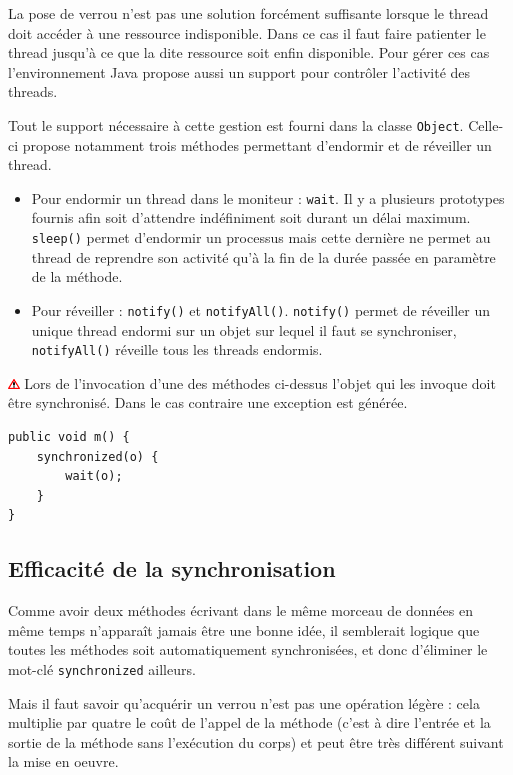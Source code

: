 \documentclass[a4paper,11pt]{report}
\newcommand{\attention}[1]{
	\begin{center}
	\medskip
	\colorbox{attention}{
		\begin{minipage}{0.8\textwidth}\medskip\includegraphics[height=10px]{images/attention.png} #1 \medskip\end{minipage}
	}
	\medskip
	\end{center}
}
\begin{document}
La pose de verrou n\rq{}est pas une solution forcément suffisante lorsque le thread doit accéder à une ressource indisponible. Dans ce cas il faut faire patienter le thread jusqu\rq{}à ce que la dite ressource soit enfin disponible. Pour gérer ces cas l\rq{}environnement Java propose aussi un support pour contrôler l\rq{}activité des threads.

Tout le support nécessaire à cette gestion est fourni dans la classe \texttt{Object}. Celle-ci propose notamment trois méthodes permettant d\rq{}endormir et de réveiller un thread.
\begin{itemize}
\item Pour endormir un thread dans le moniteur : \texttt{wait{}}. Il y a plusieurs prototypes fournis afin soit d\rq{}attendre indéfiniment soit durant un délai maximum.\\
\texttt{sleep()} permet d\rq{}endormir un processus mais cette dernière ne permet au thread de reprendre son activité qu\rq{}à la fin de la durée passée en paramètre de la méthode.
\item Pour réveiller : \texttt{notify()} et \texttt{notifyAll()}. \texttt{notify()} permet de réveiller un unique thread endormi sur un objet sur lequel il faut se synchroniser, \texttt{notifyAll()} réveille tous les threads endormis.
\end{itemize}

\attention{Lors de l\rq{}invocation d\rq{}une des méthodes ci-dessus l\rq{}objet qui les invoque doit être synchronisé. Dans le cas contraire une exception est générée.}

\begin{lstlisting}
public void m() {
	synchronized(o) {
		wait(o);
	}
}
\end{lstlisting}


\subsection{Efficacité de la synchronisation}

Comme avoir deux méthodes écrivant dans le même morceau de données en même temps n\rq{}apparaît jamais être une bonne idée, il semblerait logique que toutes les méthodes soit automatiquement synchronisées, et donc d\rq{}éliminer le mot-clé \texttt{synchronized} ailleurs.

Mais il faut savoir qu\rq{}acquérir un verrou n\rq{}est pas une opération légère : cela multiplie par quatre le coût de l\rq{}appel de la méthode (c\rq{}est à dire l\rq{}entrée et la sortie de la méthode sans l\rq{}exécution du corps) et peut être très différent suivant la mise en oeuvre.
\end{document}
